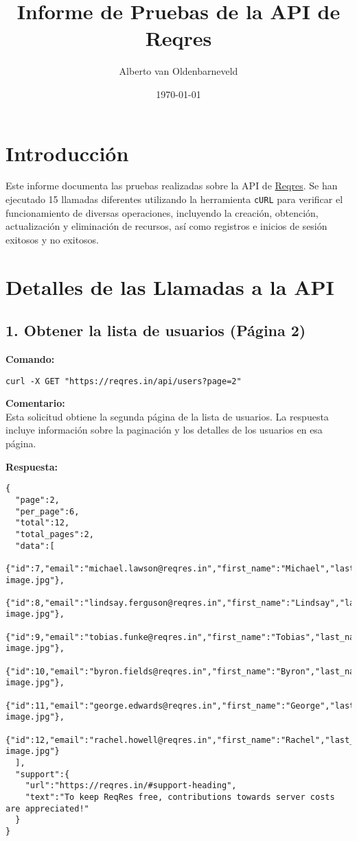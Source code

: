 \documentclass[12pt,a4paper]{article}
\title{Informe de Pruebas de la API de Reqres}
\author{Alberto van Oldenbarneveld}
\date{\today}
\begin{document}
\maketitle

\tableofcontents
\newpage

\section{Introducción}
Este informe documenta las pruebas realizadas sobre la API de \href{https://reqres.in/}{Reqres}. Se han ejecutado 15 llamadas diferentes utilizando la herramienta \texttt{cURL} para verificar el funcionamiento de diversas operaciones, incluyendo la creación, obtención, actualización y eliminación de recursos, así como registros e inicios de sesión exitosos y no exitosos.

\section{Detalles de las Llamadas a la API}

\subsection{1. Obtener la lista de usuarios (Página 2)}
\textbf{Comando:}
\begin{samepage}
\begin{verbatim}
curl -X GET "https://reqres.in/api/users?page=2"
\end{verbatim}
\end{samepage}

\textbf{Comentario:}\\
Esta solicitud obtiene la segunda página de la lista de usuarios. La respuesta incluye información sobre la paginación y los detalles de los usuarios en esa página.

\textbf{Respuesta:}
\begin{samepage}
\begin{verbatim}
{
  "page":2,
  "per_page":6,
  "total":12,
  "total_pages":2,
  "data":[
    {"id":7,"email":"michael.lawson@reqres.in","first_name":"Michael","last_name":"Lawson","avatar":"https://reqres.in/img/faces/7-image.jpg"},
    {"id":8,"email":"lindsay.ferguson@reqres.in","first_name":"Lindsay","last_name":"Ferguson","avatar":"https://reqres.in/img/faces/8-image.jpg"},
    {"id":9,"email":"tobias.funke@reqres.in","first_name":"Tobias","last_name":"Funke","avatar":"https://reqres.in/img/faces/9-image.jpg"},
    {"id":10,"email":"byron.fields@reqres.in","first_name":"Byron","last_name":"Fields","avatar":"https://reqres.in/img/faces/10-image.jpg"},
    {"id":11,"email":"george.edwards@reqres.in","first_name":"George","last_name":"Edwards","avatar":"https://reqres.in/img/faces/11-image.jpg"},
    {"id":12,"email":"rachel.howell@reqres.in","first_name":"Rachel","last_name":"Howell","avatar":"https://reqres.in/img/faces/12-image.jpg"}
  ],
  "support":{
    "url":"https://reqres.in/#support-heading",
    "text":"To keep ReqRes free, contributions towards server costs are appreciated!"
  }
}
\end{verbatim}
\end{samepage}
\end{document}
